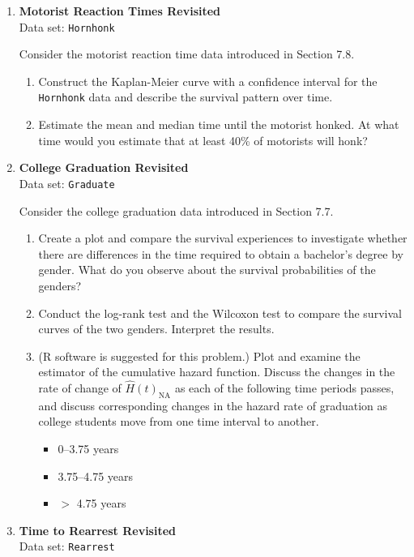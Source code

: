 \documentclass[
]{report}
\begin{document}
\begin{enumerate}
  \item \textbf{Motorist Reaction Times Revisited}\\
  Data set: \texttt{Hornhonk}

Consider the motorist reaction time data introduced in Section 7.8.
  \begin{enumerate}
    \item Construct the Kaplan-Meier curve with a confidence interval for the \texttt{Hornhonk} data and describe the survival pattern over time.
    \item Estimate the mean and median time until the motorist honked. At what time would you estimate that at least 40\% of motorists will honk?
  \end{enumerate}

  \item \textbf{College Graduation Revisited}\\
  Data set: \texttt{Graduate}

Consider the college graduation data introduced in Section 7.7.
  \begin{enumerate}
    \item Create a plot and compare the survival experiences to investigate whether there are differences in the time required to obtain a bachelor’s degree by gender. What do you observe about the survival probabilities of the genders?
    \item Conduct the log-rank test and the Wilcoxon test to compare the survival curves of the two genders. Interpret the results.
    \item (R software is suggested for this problem.) Plot and examine the estimator of the cumulative hazard function. Discuss the changes in the rate of change of $\scriptstyle \widehat{H}(t)_{\mathrm{NA}}$ as each of the following time periods passes, and discuss corresponding changes in the hazard rate of graduation as college students move from one time interval to another.
      \begin{itemize}
        \item 0–3.75 years
        \item 3.75–4.75 years
        \item $\scriptstyle >$ 4.75 years
      \end{itemize}
  \end{enumerate}

  \item \textbf{Time to Rearrest Revisited}\\
  Data set: \texttt{Rearrest}


\end{enumerate}
\end{document}
